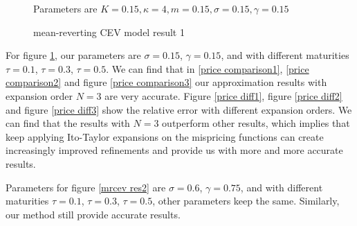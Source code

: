 \begin{figure}[ht]
  \hfill
  \caption{mean-reverting CEV model result 1}
  \small{Parameters are $K=0.15, \kappa=4, m=0.15, \sigma=0.15, \gamma=0.15$}
  \label{mrcev res1}
\end{figure}

For figure \ref{mrcev res1}, our parameters are $\sigma=0.15$, $\gamma=0.15$, and with different maturities $\tau=0.1$, $\tau=0.3$, $\tau=0.5$. We can find that in \ref{price comparison1}, \ref{price comparison2} and figure \ref{price comparison3} our approximation results with expansion order $N=3$ are very accurate. Figure \ref{price diff1}, figure \ref{price diff2} and figure \ref{price diff3} show the relative error with different expansion orders. We can find that the results with $N=3$ outperform other results, which implies that keep applying Ito-Taylor expansions on the mispricing functions can create increasingly improved refinements and provide us with more and more accurate results.

Parameters for figure \ref{mrcev res2} are $\sigma=0.6$, $\gamma=0.75$, and with different maturities $\tau=0.1$, $\tau=0.3$, $\tau=0.5$, other parameters keep the same. Similarly, our method still provide accurate results.

